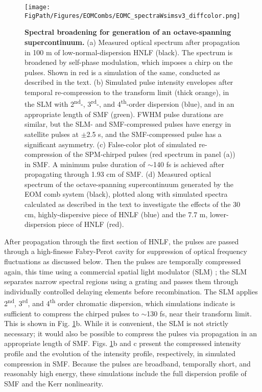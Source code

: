 \begin{figure}[htpb]
	\begin{center}
		\texttt{[image: \\FigPath/Figures/EOMCombs/EOMC\_spectraWsimsv3\_diffcolor.png]}
	\end{center}
	\caption[Spectral broadening for generation of an octave-spanning supercontinuum]{\textbf{Spectral broadening for generation of an octave-spanning supercontinuum.} (a) Measured optical spectrum after propagation in 100 m of low-normal-dispersion HNLF (black). The spectrum is broadened by self-phase modulation, which imposes a chirp on the pulses. Shown in red is a simulation of the same, conducted as described in the text. (b) Simulated pulse intensity envelopes after temporal re-compression to the transform limit (thick orange), in the SLM with 2\textsuperscript{nd}-, 3\textsuperscript{rd}-, and 4\textsuperscript{th}-order dispersion (blue), and in an appropriate length of SMF (green). FWHM pulse durations are similar, but the SLM- and SMF-compressed pulses have energy in satellite pulses at $\pm$2.5 s, and the SMF-compressed pulse has a significant asymmetry. (c) False-color plot of simulated re-compression of the SPM-chirped pulses (red spectrum in panel (a)) in SMF. A minimum pulse duration of $\sim$140 fs is achieved after propagating through 1.93 cm of SMF. (d) Measured optical spectrum of the octave-spanning supercontinuum generated by the EOM comb system (black), plotted along with simulated spectra calculated as described in the text to investigate the effects of the 30 cm, highly-dispersive piece of HNLF (blue) and the 7.7 m, lower-dispersion piece of HNLF (red).}
	\label{fig:EOMC_Broadening}
\end{figure} 

After propagation through the first section of HNLF, the pulses are passed through a high-finesse Fabry-Perot cavity for suppression of optical frequency fluctuations as discussed below. Then the pulses are temporally compressed again, this time using a commercial spatial light modulator (SLM) \cite{Weiner2000}; the SLM separates narrow spectral regions using a grating and passes them through individually controlled delaying elements before recombination. The SLM applies 2\textsuperscript{nd}, 3\textsuperscript{rd}, and 4\textsuperscript{th} order chromatic dispersion, which simulations indicate is sufficient to compress the chirped pulses to $\sim$130 fs, near their transform limit. This is shown in Fig. \ref{fig:EOMC_Broadening}b. While it is convenient, the SLM is not strictly necessary; it would also be possible to compress the pulses via propagation in an appropriate length of SMF. Figs. \ref{fig:EOMC_Broadening}b and c present the compressed intensity profile and the evolution of the intensity profile, respectively, in simulated compression in SMF. Because the pulses are broadband, temporally short, and reasonably high energy, these simulations include the full dispersion profile of SMF and the Kerr nonlinearity.




